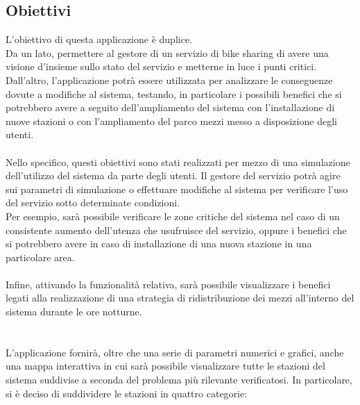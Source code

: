 \documentclass[a4paper, 12pt]{article}
\begin{document}
\newpage

	\subsection{Obiettivi}

	L'obiettivo di questa applicazione è duplice. \\
Da un lato, permettere al gestore di un servizio di bike sharing di avere una visione d'insieme sullo stato del servizio e metterne in luce i punti critici. \\ 
Dall'altro, l'applicazione potrà essere utilizzata per analizzare le conseguenze dovute a modifiche al sistema, testando, in particolare i possibili benefici che si potrebbero avere a seguito dell'ampliamento del sistema con l'installazione di nuove stazioni o con l'ampliamento del parco mezzi messo a disposizione degli utenti.\\\\
Nello specifico, questi obiettivi sono stati realizzati per mezzo di una simulazione dell'utilizzo del sistema da parte degli utenti. Il gestore del servizio potrà agire sui parametri di simulazione o effettuare modifiche al sistema per verificare l'uso del servizio sotto determinate condizioni. \\ Per esempio, sarà possibile verificare le zone critiche del sistema nel caso di un consistente aumento dell'utenza che usufruisce del servizio, oppure i benefici che si potrebbero avere in caso di installazione di una nuova stazione in una particolare area.\\\\
Infine, attivando la funzionalità relativa, sarà possibile visualizzare i benefici legati alla realizzazione di una strategia di ridistribuzione dei mezzi all'interno del sistema durante le ore notturne.\\\\\\
L'applicazione fornirà, oltre che una serie di parametri numerici e grafici, anche una mappa interattiva in cui sarà possibile visualizzare tutte le stazioni del sistema suddivise a seconda del problema più rilevante verificatosi. In particolare, si è deciso di suddividere le stazioni in quattro categorie:
\end{document}
